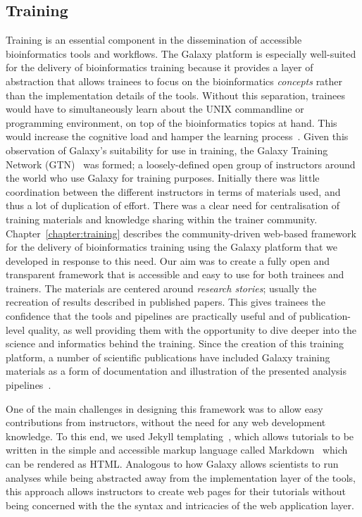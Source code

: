 \subsection{Training}
Training is an essential component in the dissemination of accessible bioinformatics tools and workflows. The Galaxy platform is especially well-suited for the delivery of bioinformatics training because it provides a layer of abstraction that allows trainees to focus on the bioinformatics \emph{concepts} rather than the implementation details of the tools. Without this separation, trainees would have to simultaneously learn about the UNIX commandline or programming environment, on top of the bioinformatics topics at hand. This would increase the cognitive load and hamper the learning process~\cite{paas2003cognitive}. Given this observation of Galaxy's suitability for use in training, the Galaxy Training Network (GTN)~\cite{url-gtn} was formed; a loosely-defined open group of instructors around the world who use Galaxy for training purposes. Initially there was little coordination between the different instructors in terms of materials used, and thus a lot of duplication of effort. There was a clear need for centralisation of training materials and knowledge sharing within the trainer community. Chapter~\ref{chapter:training} describes the community-driven web-based framework for the delivery of bioinformatics training using the Galaxy platform that we developed in response to this need.
Our aim was to create a fully open and transparent framework that is accessible and easy to use for both trainees and trainers. The materials are centered around \emph{research stories}; usually the recreation of results described in published papers. This gives trainees the confidence that the tools and pipelines are practically useful and of publication-level quality, as well providing them with the opportunity to dive deeper into the science and informatics behind the training. Since the creation of this training platform, a number of scientific publications have included Galaxy training materials as a form of documentation and illustration of the presented analysis pipelines~\cite{gruning2017rna,blank2018disseminating,batut2017asaim,hiltemann2018galaxy}.

One of the main challenges in designing this framework was to allow easy contributions from instructors, without the need for any web development knowledge. To this end, we used Jekyll templating~\cite{url-jekyll}, which allows tutorials to be written in the simple and accessible markup language called Markdown~\cite{url-markdown} which can be rendered as HTML. Analogous to how Galaxy allows scientists to run analyses while being abstracted away from the implementation layer of the tools, this approach allows instructors to create web pages for their tutorials without being concerned with the the syntax and intricacies of the web application layer.

